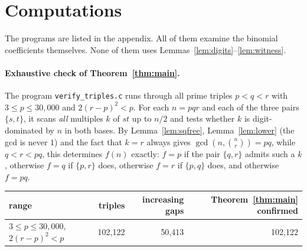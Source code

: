 \documentclass[11pt,a4paper]{article}
\theoremstyle{definition}
\newcommand{\bin}[2]{\binom{#1}{#2}}
\begin{document}
\section{Computations}\label{sec:comp}

The programs are listed in the appendix. All of them examine the binomial coefficients themselves. None of them uses Lemmas~\ref{lem:digits}--\ref{lem:witness}.

\paragraph{Exhaustive check of Theorem~\ref{thm:main}.}
The program \texttt{verify\_triples.c} runs through all prime triples $p<q<r$ with $3\le p\le 30{,}000$ and $2(r-p)^2<p$. For each $n=pqr$ and each of the three pairs $\{s,t\}$, it scans \emph{all} multiples $k$ of $st$ up to $n/2$ and tests whether $k$ is digit-dominated by $n$ in both bases. By Lemma~\ref{lem:sqfree}, Lemma~\ref{lem:lower} (the gcd is never $1$) and the fact that $k=r$ always gives $\gcd(n,\bin nr)=pq$, while $q<r<pq$, this determines $f(n)$ exactly: $f=p$ if the pair $\{q,r\}$ admits such a $k$, otherwise $f=q$ if $\{p,r\}$ does, otherwise $f=r$ if $\{p,q\}$ does, and otherwise $f=pq$.
\begin{center}
\begin{tabular}{lrrr}\toprule
range & triples & increasing gaps & Theorem~\ref{thm:main} confirmed\\\midrule
$3\le p\le 30{,}000$, $2(r-p)^2<p$ & 102{,}122 & 50{,}413 & 102{,}122\\\bottomrule
\end{tabular}
\end{center}
\end{document}
